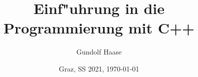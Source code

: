 \documentclass[a4paper,landscape]{book}
\begin{document}
\title{Einf"uhrung in die Programmierung mit C++}
\author{Gundolf Haase}
\date{{\normalsize Graz, SS 2021, \today }
     }
\maketitle
	\thispagestyle{empty}
	\cleardoublepage
		\setcounter{page}{0}
\tableofcontents
	\cleardoublepage
		\setcounter{page}{0}


%
%
%
%

















\nocite{Breymann:2017:DCP,Fibelkorn:2007:SKP}
\nocite{Filipek:2018:SKP}
\nocite{Galowicz:2017:CPS,Gode:1998:ANK,Gottschling:2019:FMC,Grimm:2011:CLP,HuntThomas:2003:DPP}
\nocite{KirchPrinz:2002:OOP,Louis:2006:CPE,Meyers:1998:ECP,Meyers:1997:MEC,Meyers:2015:EMP}
\nocite{OramTalbott:1993:MPM,PombergerDobler:2008:AUD}
\nocite{SchaderKuhlins:1998:PCP,SpillnerBreymann:2016:LTP,Strasser:2003:PMS,Stroustrup:2000:CPP,Stroustrup:2010:EPC}
\nocite{Will:2012:CPT,Will:2018:CPT}







\lstlistoflistings

\printindex
\end{document}
